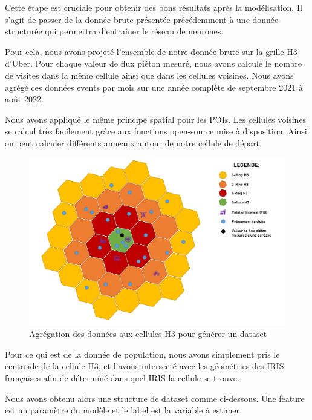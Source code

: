 Cette étape est cruciale pour obtenir des bons résultats après la modélisation. Il s'agit de passer de la donnée brute présentée précédemment à une donnée structurée qui permettra d'entraîner le réseau de neurones.

Pour cela, nous avons projeté l'ensemble de notre donnée brute sur la grille H3 d'Uber. Pour chaque valeur de flux piéton mesuré, nous avons calculé le nombre de visites dans la même cellule ainsi que dans les cellules voisines. Nous avons agrégé ces données events par mois sur une année complète de septembre 2021 à août 2022.

Nous avons appliqué le même principe spatial pour les POIs. Les cellules voisines se calcul très facilement grâce aux fonctions open-source mise à disposition. Ainsi on peut calculer différents anneaux autour de notre cellule de départ.


\begin{figure}[H]
    \centering
    \includegraphics[width=\linewidth]{images/graphs/dataset.png}
    \captionsetup{justification=centering}
    \caption{Agrégation des données aux cellules H3 pour générer un dataset}
    \label{fig:dataset_aggregation}
\end{figure}

Pour ce qui est de la donnée de population, nous avons simplement pris le centroïde de la cellule H3, et l'avons intersecté avec les géométries des IRIS françaises afin de déterminé dans quel IRIS la cellule se trouve.

Nous avons obtenu alors une structure de dataset comme ci-dessous. Une feature est un paramètre du modèle et le label est la variable à estimer.


